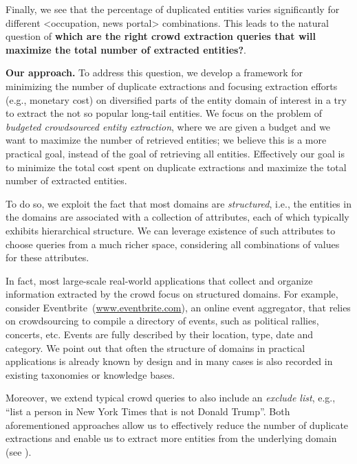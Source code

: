 Finally, we see that the percentage of duplicated entities varies significantly for different <occupation, news portal> combinations. This leads to the natural question of {\bf which are the right crowd extraction queries that will maximize the total number of extracted entities?}. 

\vspace{5pt}\noindent\textbf{Our approach.} To address this question, we develop a framework for minimizing the number of duplicate extractions and focusing extraction efforts (e.g., monetary cost) on diversified parts of the entity domain of interest in a try to extract the not so popular long-tail entities. We focus on the problem of {\em budgeted crowdsourced entity extraction}, where we are given a budget and we want to maximize the number of retrieved entities; we believe this is a more practical goal, instead of the goal of retrieving all entities.  Effectively our goal is to minimize the total cost spent on duplicate extractions and maximize the total number of extracted entities. 

To do so, we exploit the fact that most domains are {\em structured}, i.e., the entities in the domains are associated with a collection of attributes, each of which typically exhibits hierarchical structure. We can leverage existence of such attributes to choose queries from a much richer space, considering all combinations of values for these attributes.

In fact, most large-scale real-world applications that collect and organize information extracted by the crowd focus on structured domains. For example, consider Eventbrite~(\url{www.eventbrite.com}), an online event aggregator, that relies on crowdsourcing to compile a directory of events, such as political rallies, concerts, etc. Events are fully described by their location, type, date and category. We point out that often the structure of domains in practical applications is already known by design and in many cases is also recorded in existing taxonomies or knowledge bases. 

Moreover, we extend typical crowd queries to also include an {\em exclude list}, e.g., ``list a person in New York Times that is not Donald Trump''. Both aforementioned approaches allow us to effectively reduce the number of duplicate extractions and enable us to extract more entities from the underlying domain (see ).

